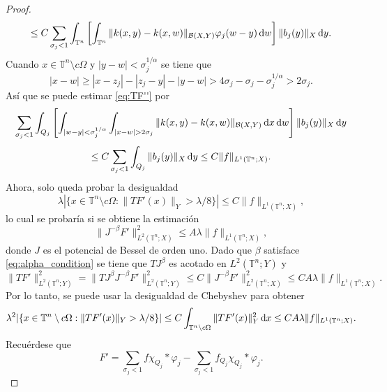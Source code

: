 \begin{proof}
\begin{equation*}
		\leq  C \sum_{\sigma_j< 1}\int_{\mathbb{T}^n}\left[\int_{\mathbb{T}^n}\|k(x, y) - k(x, w)\|_{\mathcal{B}(X,Y)}\varphi_j(w-y)\mathop{}\!\mathrm{d} w\right] \|b_j(y)\|_X\mathop{}\!\mathrm{d} y.
	\end{equation*}
	Cuando $x \in \mathbb{T}^n \setminus c\Omega$ y $|y - w| < \sigma_j^{1/\alpha}$ se tiene que
	\begin{equation*}
		|x-w| \geq |x-z_j| - |z_j - y| - |y - w| > 4\sigma_j - \sigma_j - \sigma_j^{1/\alpha} > 2\sigma_j.
	\end{equation*}
	Así que se puede estimar \cref{eq:TF''} por
	\begin{equation*}
		\sum_{\sigma_j< 1}\int_{Q_j}\left[\int_{|w-y|<\sigma_j^{1/\alpha}}\int_{|x-w|>2\sigma_j}\|k(x, y) - k(x, w)\|_{\mathcal{B}(X,Y)}\diff x \diff w\right] \|b_j(y)\|_X\diff y
	\end{equation*}
	\begin{equation*}
		\leq C\sum_{\sigma_j<1} \int_{Q_j}\|b_j(y)\|_X\mathop{}\!\mathrm{d} y  \leq C\|f\|_{L^1(\mathbb{T}^n; X)}.
	\end{equation*}
	Ahora, solo queda probar la desigualdad
	\begin{equation*}
		\lambda |\{ x \in \mathbb{T}^n \setminus c\Omega : \|TF'(x)\|_Y > \lambda/8 \}| \leq C\|f\|_{L^1(\mathbb{T}^n; X)},
	\end{equation*}
	lo cual se probaría si se obtiene la estimación
	\begin{equation}
		\|J^{-\beta} F'\|_{L^2(\mathbb{T}^n; X)}^2 \leq A\lambda \|f\|_{L^1(\mathbb{T}^n; X)},
	\end{equation}
	donde $J$ es el potencial de Bessel de orden uno. Dado que $\beta$ satisface \cref{eq:alpha_condition} se tiene que $TJ^{\beta}$ es acotado en $L^2(\mathbb{T}^n;Y)$ y
	\begin{equation*}
		\|T F'\|_{L^2(\mathbb{T}^n; Y)}^2 =\|TJ^{\beta}J^{-\beta }F'\|_{L^2(\mathbb{T}^n; Y)}^2 \leq  C\|J^{-\beta} F'\|_{L^2(\mathbb{T}^n; X)}^2 \leq CA\lambda \|f\|_{L^1(\mathbb{T}^n; X)}.
	\end{equation*}
	Por lo tanto, se puede usar la desigualdad de Chebyshev para obtener
	\begin{equation*}
		\lambda^2 |\{ x \in \mathbb{T}^n \setminus c\Omega : \|TF'(x)\|_Y > \lambda/8 \}| \leq C \int_{\mathbb{T}^n \setminus c\Omega} \|TF'(x)\|_Y^2\mathop{}\!\mathrm{d} x  \leq CA\lambda\|f\|_{L^1(\mathbb{T}^n; X)}.
	\end{equation*}
	Recuérdese que
	\begin{equation*}
		F' = \sum_{\sigma_j < 1}f\chi_{Q_j} * \varphi_j - \sum_{\sigma_j < 1}f_{Q_j}\chi_{Q_j}*\varphi_j.

\end{equation*}
\end{proof}
